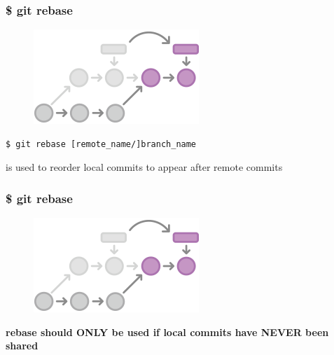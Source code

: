 \documentclass{beamer}
\begin{document}
\begin{frame}[fragile]
    \frametitle{\$ git rebase}
    \begin{figure}[h!]
        \begin{center}
            \includegraphics[scale=0.9]{rebase.png}
        \end{center}
    \end{figure}
    \begin{verbatim}
$ git rebase [remote_name/]branch_name
    \end{verbatim}
    is used to reorder local commits to appear after remote commits
\end{frame}

\begin{frame}
    \frametitle{\$ git rebase}
    \begin{figure}[h!]
        \begin{center}
            \includegraphics[scale=0.9]{rebase.png}
        \end{center}
    \end{figure}
    \textbf{rebase should ONLY be used if local commits have NEVER been shared}
\end{frame}
\end{document}
